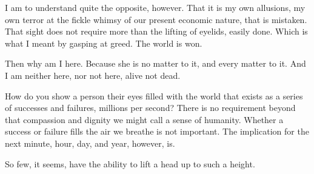 I am to understand quite the opposite, however.  That it is my own allusions, my own terror at the fickle whimsy of our present economic nature, that is mistaken.  That sight does not require more than the lifting of eyelids, easily done.  Which is what I meant by gasping at greed.  The world is won.


Then why am I here.  Because she is no matter to it, and every matter to it.  And I am neither here, nor not here, alive not dead.


How do you show a person their eyes filled with the world that exists as a series of successes and failures, millions per second?  There is no requirement beyond that compassion and dignity we might call a sense of humanity.  Whether a success or failure fills the air we breathe is not important.  The implication for the next minute, hour, day, and year, however, is.


So few, it seems, have the ability to lift a head up to such a height.
\bye

